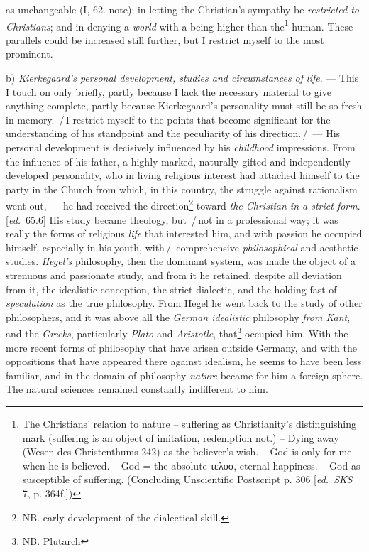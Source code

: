 \documentclass[12pt,a4paper,openany]{book}
\newcommand{\kpage}[1]{\marginnote{\footnotesize\textit{[#1]}}}
\newcommand{\ed}[1]{{\small[\textit{ed.}\ #1]}}
\newcommand{\ins}[1]{\,/\,#1\,/\,}
\newcommand{\lecture}[1]{\par\bigskip\noindent{\large #1}\par\nobreak\medskip}
\begin{document}
as unchangeable (I, 62. note); in letting the Christian's sympathy
be \emph{restricted to Christians}; and in denying a \emph{world} with a being
higher than the\footnote[24]{The Christians' relation to nature -- suffering as Christianity's distinguishing mark
(suffering is an object of imitation, redemption not.) -- Dying away
(Wesen des Christenthums 242) as the believer's wish. -- God is only for
me when he is believed. -- God = the absolute τελοσ, eternal happiness. -- God as
susceptible of suffering. (Concluding Unscientific Postscript p. 306 \ed{\emph{SKS} 7, p.
364f.})}
human. These parallels could be increased still
further, but I restrict myself to the most
prominent. ---

\lecture{Lecture 21}

b) \emph{Kierkegaard's personal development, studies and circumstances of life}. --- This I touch on
only briefly, partly because I lack the necessary material
to give anything complete, partly because Kierkegaard's personality
must still be so fresh in memory. \ins{I restrict myself to
the points that become significant for the understanding of his standpoint
and the peculiarity of his direction.} --- His personal
development is decisively influenced by his \emph{childhood} impressions. From
the influence of his father, a highly marked, naturally gifted
and independently developed personality, who in living religious
interest had attached himself to the party in the Church from which, in this country,
the struggle against rationalism went out, --- he had received
the direction\footnote[25]{NB. early development of the dialectical skill.}
toward \emph{the Christian in a strict form}. \ed{65.6} His study
became theology, but \ins{not in a professional way; it was really
the forms of religious \emph{life} that interested him, and with passion
he occupied himself, especially in his youth, with} comprehensive \emph{philosophical}
and aesthetic studies. \emph{Hegel's} philosophy, then the dominant\kpage{101}
system, was made the object of a strenuous and passionate
study, and from it he retained, despite all deviation from it,
the idealistic conception, the strict dialectic, and the holding fast
of \emph{speculation} as the true philosophy. From Hegel he went back
to the study of other philosophers, and it was above all the \emph{German
idealistic} philosophy \emph{from Kant}, and the \emph{Greeks}, particularly \emph{Plato} and \emph{Aristotle},
that\footnote[26]{NB. Plutarch}
occupied him. With the more recent forms of philosophy
that have arisen outside Germany, and with the oppositions
that have appeared there against idealism, he seems to have been less
familiar, and in the domain of philosophy \emph{nature} became for him a
foreign sphere. The natural sciences remained constantly indifferent to him.
\end{document}
